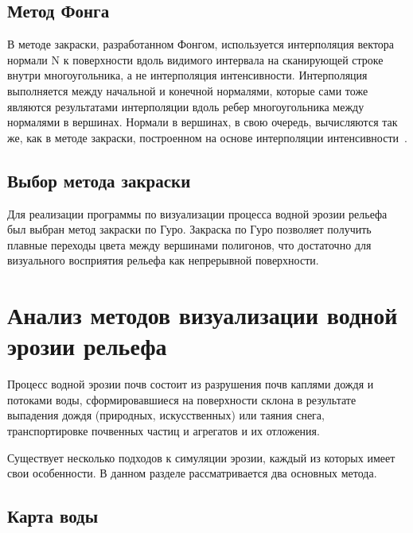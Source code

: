 \subsection{Метод Фонга}

В методе закраски, разработанном Фонгом, используется
интерполяция вектора нормали N к поверхности вдоль видимого
интервала на сканирующей строке внутри многоугольника, а не
интерполяция интенсивности. Интерполяция выполняется между
начальной и конечной нормалями, которые сами тоже являются
результатами интерполяции вдоль ребер многоугольника между
нормалями в вершинах. Нормали в вершинах, в свою очередь,
вычисляются так же, как в методе закраски, построенном на основе
интерполяции интенсивности~\cite{dem_cg}.

\subsection{Выбор метода закраски}

Для реализации программы по визуализации процесса водной эрозии рельефа был выбран метод закраски по Гуро.
Закраска по Гуро позволяет получить плавные переходы цвета между вершинами полигонов,
что достаточно для визуального восприятия рельефа как непрерывной поверхности.


\section{Анализ методов визуализации водной эрозии рельефа}

Процесс
водной эрозии почв состоит из разрушения
почв каплями дождя и потоками воды, сформировавшиеся на поверхности склона в результате выпадения дождя
(природных, искусственных) или таяния снега, транспортировке почвенных частиц и агрегатов и их отложения\cite{err}.


Существует несколько подходов к симуляции эрозии, каждый из которых имеет свои особенности.
В данном разделе рассматривается два основных метода.

\subsection{Карта воды}

